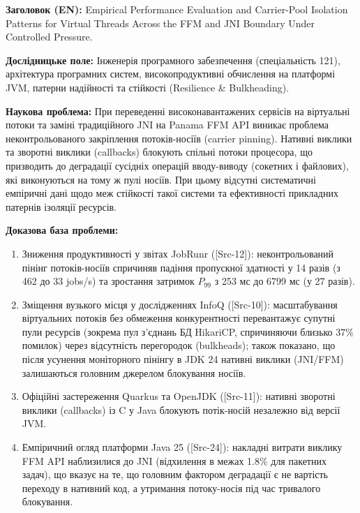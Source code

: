 \textbf{Заголовок (EN):} \foreignlanguage{english}{Empirical Performance Evaluation and Carrier-Pool Isolation Patterns for Virtual Threads Across the FFM and JNI Boundary Under Controlled Pressure.}

\textbf{Дослідницьке поле:} Інженерія програмного забезпечення (спеціальність 121), архітектура програмних систем, високопродуктивні обчислення на платформі JVM, патерни надійності та стійкості (Resilience \& Bulkheading).

\textbf{Наукова проблема:} При переведенні високонавантажених сервісів на віртуальні потоки та заміні традиційного JNI на Panama FFM API виникає проблема неконтрольованого закріплення потоків-носіїв (carrier pinning). Нативні виклики та зворотні виклики (callbacks) блокують спільні потоки процесора, що призводить до деградації сусідніх операцій вводу-виводу (сокетних і файлових), які виконуються на тому ж пулі носіїв. При цьому відсутні систематичні емпіричні дані щодо меж стійкості такої системи та ефективності прикладних патернів ізоляції ресурсів.

\textbf{Доказова база проблеми:}
\begin{enumerate}[wide]
    \item Зниження продуктивності у звітах JobRunr ([Src-12]): неконтрольований пінінг потоків-носіїв спричиняв падіння пропускної здатності у 14 разів (з 462 до 33 jobs/s) та зростання затримок $P_{99}$ з 253 мс до 6799 мс (у 27 разів).
    \item Зміщення вузького місця у дослідженнях InfoQ ([Src-10]): масштабування віртуальних потоків без обмеження конкурентності перевантажує супутні пули ресурсів (зокрема пул з'єднань БД HikariCP, спричиняючи близько 37\% помилок) через відсутність перегородок (bulkheads); також показано, що після усунення моніторного пінінгу в JDK 24 нативні виклики (JNI/FFM) залишаються головним джерелом блокування носіїв.
    \item Офіційні застереження Quarkus та OpenJDK ([Src-11]): нативні зворотні виклики (callbacks) із C у Java блокують потік-носій незалежно від версії JVM.
    \item Емпіричний огляд платформи Java 25 ([Src-24]): накладні витрати виклику FFM API наблизилися до JNI (відхилення в межах 1.8\% для пакетних задач), що вказує на те, що головним фактором деградації є не вартість переходу в нативний код, а утримання потоку-носія під час тривалого блокування.
\end{enumerate}

